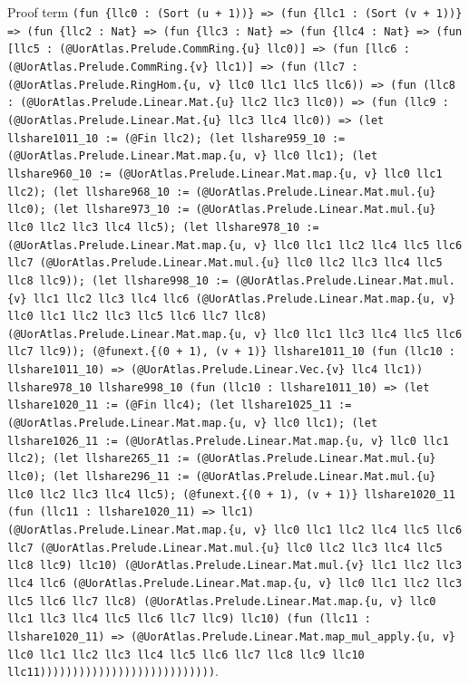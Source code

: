 \documentclass[11pt]{article}
\begin{document}
\noindent Proof term \texttt{(fun \{llc0 : (Sort (u + 1))\} => (fun \{llc1 : (Sort (v + 1))\} => (fun \{llc2 : Nat\} => (fun \{llc3 : Nat\} => (fun \{llc4 : Nat\} => (fun [llc5 : (@UorAtlas.Prelude.CommRing.\{u\} llc0)] => (fun [llc6 : (@UorAtlas.Prelude.CommRing.\{v\} llc1)] => (fun (llc7 : (@UorAtlas.Prelude.RingHom.\{u, v\} llc0 llc1 llc5 llc6)) => (fun (llc8 : (@UorAtlas.Prelude.Linear.Mat.\{u\} llc2 llc3 llc0)) => (fun (llc9 : (@UorAtlas.Prelude.Linear.Mat.\{u\} llc3 llc4 llc0)) => (let llshare1011\_10 := (@Fin llc2); (let llshare959\_10 := (@UorAtlas.Prelude.Linear.Mat.map.\{u, v\} llc0 llc1); (let llshare960\_10 := (@UorAtlas.Prelude.Linear.Mat.map.\{u, v\} llc0 llc1 llc2); (let llshare968\_10 := (@UorAtlas.Prelude.Linear.Mat.mul.\{u\} llc0); (let llshare973\_10 := (@UorAtlas.Prelude.Linear.Mat.mul.\{u\} llc0 llc2 llc3 llc4 llc5); (let llshare978\_10 := (@UorAtlas.Prelude.Linear.Mat.map.\{u, v\} llc0 llc1 llc2 llc4 llc5 llc6 llc7 (@UorAtlas.Prelude.Linear.Mat.mul.\{u\} llc0 llc2 llc3 llc4 llc5 llc8 llc9)); (let llshare998\_10 := (@UorAtlas.Prelude.Linear.Mat.mul.\{v\} llc1 llc2 llc3 llc4 llc6 (@UorAtlas.Prelude.Linear.Mat.map.\{u, v\} llc0 llc1 llc2 llc3 llc5 llc6 llc7 llc8) (@UorAtlas.Prelude.Linear.Mat.map.\{u, v\} llc0 llc1 llc3 llc4 llc5 llc6 llc7 llc9)); (@funext.\{(0 + 1), (v + 1)\} llshare1011\_10 (fun (llc10 : llshare1011\_10) => (@UorAtlas.Prelude.Linear.Vec.\{v\} llc4 llc1)) llshare978\_10 llshare998\_10 (fun (llc10 : llshare1011\_10) => (let llshare1020\_11 := (@Fin llc4); (let llshare1025\_11 := (@UorAtlas.Prelude.Linear.Mat.map.\{u, v\} llc0 llc1); (let llshare1026\_11 := (@UorAtlas.Prelude.Linear.Mat.map.\{u, v\} llc0 llc1 llc2); (let llshare265\_11 := (@UorAtlas.Prelude.Linear.Mat.mul.\{u\} llc0); (let llshare296\_11 := (@UorAtlas.Prelude.Linear.Mat.mul.\{u\} llc0 llc2 llc3 llc4 llc5); (@funext.\{(0 + 1), (v + 1)\} llshare1020\_11 (fun (llc11 : llshare1020\_11) => llc1) (@UorAtlas.Prelude.Linear.Mat.map.\{u, v\} llc0 llc1 llc2 llc4 llc5 llc6 llc7 (@UorAtlas.Prelude.Linear.Mat.mul.\{u\} llc0 llc2 llc3 llc4 llc5 llc8 llc9) llc10) (@UorAtlas.Prelude.Linear.Mat.mul.\{v\} llc1 llc2 llc3 llc4 llc6 (@UorAtlas.Prelude.Linear.Mat.map.\{u, v\} llc0 llc1 llc2 llc3 llc5 llc6 llc7 llc8) (@UorAtlas.Prelude.Linear.Mat.map.\{u, v\} llc0 llc1 llc3 llc4 llc5 llc6 llc7 llc9) llc10) (fun (llc11 : llshare1020\_11) => (@UorAtlas.Prelude.Linear.Mat.map\_mul\_apply.\{u, v\} llc0 llc1 llc2 llc3 llc4 llc5 llc6 llc7 llc8 llc9 llc10 llc11)))))))))))))))))))))))))))}.\par
\end{document}
